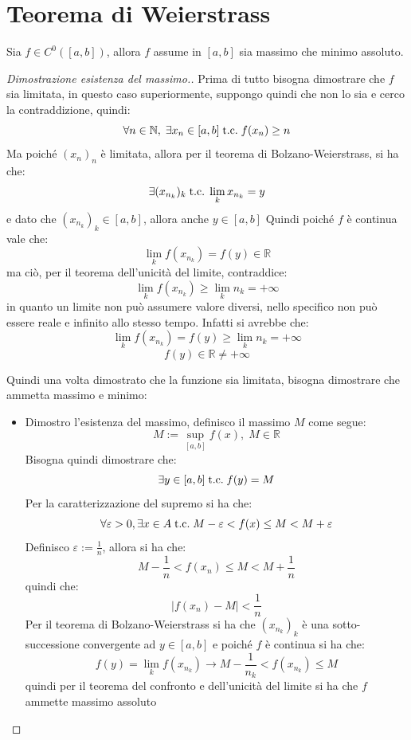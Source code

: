 \documentclass[a4paper,12pt,openright]{book}
\begin{document}
    \section{Teorema di Weierstrass}
    Sia $f \in C^ 0([a, b])$, allora $f$ assume in $[a, b]$ sia massimo che minimo assoluto.
    \begin{proof}[Dimostrazione esistenza del massimo.]
        Prima di tutto bisogna dimostrare che $f$ sia limitata, in questo caso superiormente, suppongo quindi che non lo sia e cerco la contraddizione, quindi:
        \[\forall n \in \mathbb{N}, \; \exists x_n \in [a, b] \;\text{t.c.}\; f(x_n) \geq n\]
        Ma poiché $(x_n)_n$ è limitata, allora per il teorema di Bolzano-Weierstrass, si ha che:
        \[\exists (x_{n_k})_k \;\text{t.c.}\; \lim_{k} x_{n_k} = y\]
        e dato che $(x_{n_k})_k \in [a, b]$, allora anche $y \in [a, b]$
        Quindi poiché $f$ è continua vale che:
        \[\lim_{k} f(x_{n_k}) = f(y) \in \mathbb{R}\]
        ma ciò, per il teorema dell'unicità del limite, contraddice:
        \[\lim_{k} f(x_{n_k}) \geq \lim_{k} n_k = +\infty\]
        in quanto un limite non può assumere valore diversi, nello specifico non può essere reale e infinito allo stesso tempo. Infatti si avrebbe che:
        \[\lim_{k} f(x_{n_k}) = f(y) \geq \lim_{k} n_k = +\infty\]
        \[f(y) \in \mathbb{R} \not = +\infty\] 
        
        Quindi una volta dimostrato che la funzione sia limitata, bisogna dimostrare che ammetta massimo e minimo:
        \begin{itemize}
        	\item Dimostro l'esistenza del massimo, definisco il massimo $M$ come segue:
        	\[M := \sup_{[a, b]} f(x), \; M \in \mathbb{R}\]
        	Bisogna quindi dimostrare che:
        	\[\exists y \in [a, b] \;\text{t.c.}\; f(y) = M\]
        	Per la caratterizzazione del supremo si ha che:
        	\[\forall \varepsilon > 0, \exists x \in A \;\text{t.c.}\; M - \varepsilon < f(x) \leq M < M + \varepsilon\]
        	Definisco $\varepsilon := \frac{1}{n}$, allora si ha che:
        	\[M - \frac{1}{n} < f(x_n) \leq M < M + \frac{1}{n}\]
        	quindi che:
        	\[|f(x_n) - M| < \frac{1}{n}\]
        	Per il teorema di Bolzano-Weierstrass si ha che $(x_{n_k})_k$ è una sotto-successione convergente ad $y \in [a, b]$ e poiché $f$ è continua si ha che:
        	\[f(y) = \lim_{k} f(x_{n_k}) \rightarrow M - \frac{1}{n_k} < f(x_{n_k}) \leq M\]
        	quindi per il teorema del confronto e dell'unicità del limite si ha che $f$ ammette massimo assoluto
        	

\end{itemize}
\end{proof}
\end{document}
